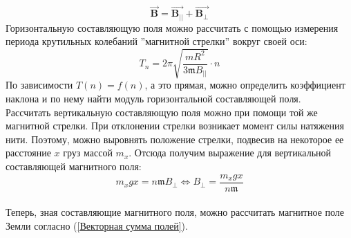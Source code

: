 \documentclass[a4paper, 12pt]{article}
\begin{document}
\begin{enumerate}
\begin{equation}
        \vec{\mathbf{B}} = \vec{\mathbf{B_{||}}} + \vec{\mathbf{B_{\perp}}}
        \label{Векторная сумма полей}
    \end{equation}
    Горизонтальную составляющую поля можно рассчитать с помощью измерения периода крутильных колебаний ''магнитной стрелки'' вокруг своей оси:
    \begin{equation}
        T_{n} = 2\pi \sqrt{\frac{mR^{2}}{3\mathfrak{m}B_{||}}}\cdot n
        \label{Период крутильных колебаний}
    \end{equation}
    По зависимости $T(n) = f(n)$, а это прямая, можно определить коэффициент наклона и по нему найти модуль горизонтальной составляющей поля.\\
    Рассчитать вертикальную составляющую поля можно при помощи той же магнитной стрелки. При отклонении стрелки возникает момент силы натяжения нити. Поэтому, можно выровнять положение стрелки, подвесив на некоторое ее расстояние $x$ груз массой $m_{x}$. Отсюда получим выражение для вертикальной составляющей магнитного поля:
    \begin{equation}
        m_{x}gx = n\mathfrak{m}B_{\perp} \iff B_{\perp} = \frac{m_{x}gx}{n\mathfrak{m}}
        \label{Вертикальная составляющая}
    \end{equation}\\
    Теперь, зная составляющие магнитного поля, можно рассчитать магнитное поле Земли согласно (\ref{Векторная сумма полей}).
\end{enumerate}
\end{document}

